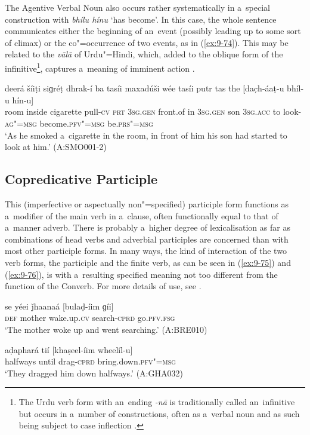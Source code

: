 The Agentive Verbal Noun also occurs rather systematically in a~special construction with \textit{bhílu hínu} `has become'. In this case, the whole sentence communicates either the beginning of an~event (possibly leading up to some sort of climax) or the co"=occurrence of two events, as in (\ref{ex:9-74}). This may be related to the \textit{vālā} of Urdu"=Hindi, which, added to the oblique form of the infinitive\footnote{The Urdu verb form with an~ending \textit{-nā} is traditionally called an~infinitive but occurs in a~number of constructions, often as a~verbal noun and as such being subject to case inflection \citep[132--142]{schmidt1999}.}, captures a~meaning of imminent action \citep[139]{schmidt1999}. 

\begin{exe}
\ex
\label{ex:9-74}
\gll deerá šíiṭi siɡréṭ dhrak-í ba tasíi maxadúši wée tasíi putr tas the [dac̣h-áaṭ-u bhíl-u hín-u] \\
room inside cigarette pull-\textsc{cv} \textsc{prt} \textsc{3sg.gen} front.of in \textsc{3sg.gen} son \textsc{3sg.acc} to look-\textsc{ag"=msg} become.\textsc{pfv"=msg} be.\textsc{prs"=msg } \\
\glt `As he smoked a~cigarette in the room, in front of him his son had started to look at him.' (A:SMO001-2)
\end{exe}

\subsection{Copredicative Participle}
\label{subsec:9-3-5}

This (imperfective or aspectually non"=specified) participle form functions as a~modifier of the main verb in a~clause, often functionally equal to that of a~manner adverb. There is probably a~higher degree of lexicalisation as far as combinations of head verbs and adverbial participles are concerned than with most other participle forms. In many ways, the kind of interaction of the two verb forms, the participle and the finite verb, as can be seen in (\ref{ex:9-75}) and (\ref{ex:9-76}), is with a~resulting specified meaning not too different from the function of the Converb. For more details of use, see . 

\begin{exe}
\ex
\label{ex:9-75}
\gll se yéei ǰhaanaá [bulaḍ-íim ɡíi]  \\
\textsc{def} mother wake.up.\textsc{cv} search-\textsc{cprd} go.\textsc{pfv.fsg} \\
\glt `The mother woke up and went searching.' (A:BRE010)

\ex
\label{ex:9-76}
\gll aḍaphará tií [khaṣeel-íim wheelíl-u] \\
halfways until drag-\textsc{cprd} bring.down.\textsc{pfv"=msg} \\
\glt `They dragged him down halfways.' (A:GHA032)
\end{exe}

